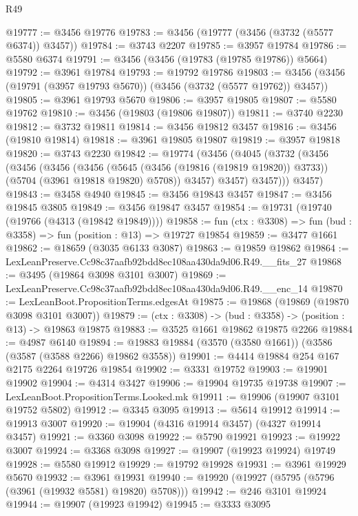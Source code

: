 \begin{lexlean}{R49}
\begin{coremodule}
@19777 := @3456 @19776
@19783 := @3456 (@19777 (@3456 (@3732 (@5577 @6374)) @3457))
@19784 := @3743 @2207
@19785 := @3957 @19784
@19786 := @5580 @6374
@19791 := @3456 (@3456 (@19783 (@19785 @19786)) @5664)
@19792 := @3961 @19784
@19793 := @19792 @19786
@19803 := @3456 (@3456 (@19791 (@3957 @19793 @5670)) (@3456 (@3732 (@5577 @19762)) @3457))
@19805 := @3961 @19793 @5670
@19806 := @3957 @19805
@19807 := @5580 @19762
@19810 := @3456 (@19803 (@19806 @19807))
@19811 := @3740 @2230
@19812 := @3732 @19811
@19814 := @3456 @19812 @3457
@19816 := @3456 (@19810 @19814)
@19818 := @3961 @19805 @19807
@19819 := @3957 @19818
@19820 := @3743 @2230
@19842 := @19774
    (@3456
      (@4045
        (@3732
          (@3456
            (@3456
              (@3456
                (@3456
                  (@5645 (@3456 (@19816 (@19819 @19820)) @3733))
                  (@5704 (@3961 @19818 @19820) @5708))
                @3457)
              @3457)
            @3457)))
      @3457)
@19843 := @3458 @4940
@19845 := @3456 @19843 @3457
@19847 := @3456 @19845 @3805
@19849 := @3456 @19847 @3457
@19854 := @19731 (@19740 (@19766 (@4313 (@19842 @19849))))
@19858 := fun (ctx : @3308) => fun (bud : @3358) => fun (position : @13) => @19727 @19854
@19859 := @3477 @1661
@19862 := @18659 (@3035 @6133 @3087)
@19863 := @19859 @19862
@19864 := LexLeanPreserve.Cc98c37aafb92bdd8ec108aa430da9d06.R49.__fits_27
@19868 := @3495 (@19864 @3098 @3101 @3007)
@19869 := LexLeanPreserve.Cc98c37aafb92bdd8ec108aa430da9d06.R49.__enc_14
@19870 := LexLeanBoot.PropositionTerms.edgesAt
@19875 := @19868 (@19869 (@19870 @3098 @3101 @3007))
@19879 := (ctx : @3308) -> (bud : @3358) -> (position : @13) -> @19863 @19875
@19883 := @3525 @1661 @19862 @19875 @2266
@19884 := @4987 @6140
@19894 := @19883 @19884 (@3570 (@3580 @1661)) (@3586 (@3587 (@3588 @2266) @19862 @3558))
@19901 := @4414 @19884 @254 @167 @2175 @2264 @19726 @19854
@19902 := @3331 @19752
@19903 := @19901 @19902
@19904 := @4314 @3427
@19906 := @19904 @19735 @19738
@19907 := LexLeanBoot.PropositionTerms.Looked.mk
@19911 := @19906 (@19907 @3101 @19752 @5802)
@19912 := @3345 @3095
@19913 := @5614 @19912
@19914 := @19913 @3007
@19920 := @19904 (@4316 @19914 @3457) (@4327 @19914 @3457)
@19921 := @3360 @3098
@19922 := @5790 @19921
@19923 := @19922 @3007
@19924 := @3368 @3098
@19927 := @19907 (@19923 @19924) @19749
@19928 := @5580 @19912
@19929 := @19792 @19928
@19931 := @3961 @19929 @5670
@19932 := @3961 @19931
@19940 := @19920 (@19927 (@5795 (@5796 (@3961 (@19932 @5581) @19820) @5708)))
@19942 := @246 @3101 @19924
@19944 := @19907 (@19923 @19942)
@19945 := @3333 @3095

\end{coremodule}
\end{lexlean}
